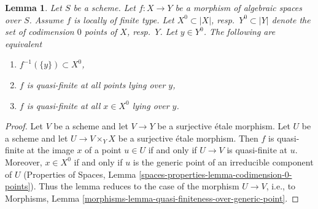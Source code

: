 \documentclass{stacks-project}
\theoremstyle{plain}
\newtheorem{lemma}[subsection]{Lemma}
\theoremstyle{definition}
\theoremstyle{remark}
\numberwithin{equation}{subsection}
\begin{document}
\begin{lemma}
\label{lemma-quasi-finiteness-over-generic-point}
Let $S$ be a scheme. Let $f : X \to Y$ be a morphism of algebraic spaces
over $S$. Assume $f$ is locally of finite type.
Let $X^0 \subset |X|$, resp.\ $Y^0 \subset |Y|$ denote the set of
codimension $0$ points of $X$, resp.\ $Y$. Let $y \in Y^0$. The following are
equivalent
\begin{enumerate}
\item $f^{-1}(\{y\}) \subset X^0$,
\item $f$ is quasi-finite at all points lying over $y$,
\item $f$ is quasi-finite at all $x \in X^0$ lying over $y$.
\end{enumerate}
\end{lemma}

\begin{proof}
Let $V$ be a scheme and let $V \to Y$ be a surjective \'etale morphism.
Let $U$ be a scheme and let $U \to V \times_Y X$ be a surjective \'etale
morphism. Then $f$ is quasi-finite at the image $x$ of a point $u \in U$
if and only if $U \to V$ is quasi-finite at $u$. Moreover, $x \in X^0$
if and only if $u$ is the generic point of an irreducible component
of $U$ (Properties of Spaces, Lemma
\ref{spaces-properties-lemma-codimension-0-points}).
Thus the lemma reduces to the case of the morphism $U \to V$, i.e., to
Morphisms, Lemma \ref{morphisms-lemma-quasi-finiteness-over-generic-point}.
\end{proof}
\end{document}
